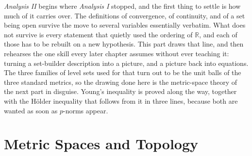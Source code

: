 \documentclass{report}
\theoremstyle{purplethm}
\theoremstyle{purplethm}
\theoremstyle{defthm}
\theoremstyle{examplethm}
\theoremstyle{questionthm}
\theoremstyle{remarkthm}
\theoremstyle{asidethm}
\theoremstyle{importantremarkthm}
\theoremstyle{remarkthm}
\theoremstyle{ainotethm}
\theoremstyle{purplethm}
\begin{document}
\emph{Analysis II} begins where \emph{Analysis I} stopped, and the first thing to settle is how
much of it carries over. The definitions of convergence, of continuity, and of a set being open
survive the move to several variables essentially verbatim. What does not survive is every
statement that quietly used the ordering of $\mathbb{R}$, and each of those has to be rebuilt on
a new hypothesis. This part draws that line, and then rehearses the one skill every later chapter
assumes without ever teaching it: turning a set-builder description into a picture, and a picture
back into equations. The three families of level sets used for that turn out to be the unit balls
of the three standard metrics, so the drawing done here is the metric-space theory of the next
part in disguise. Young's inequality is proved along the way, together with the Hölder inequality
that follows from it in three lines, because both are wanted as soon as $p$-norms appear.



\part{Metric Spaces and Topology}
\end{document}
